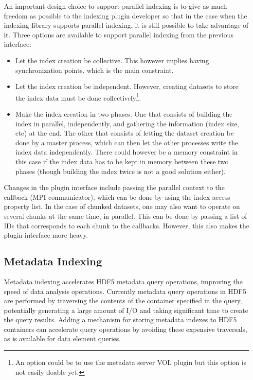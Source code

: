 An important design choice to support parallel indexing is to give as much
freedom as possible to the indexing plugin developer so that in the case when
the indexing library supports parallel indexing, it is still possible to take
advantage of it. Three options are available to support parallel indexing
from the previous interface:
\begin{itemize}
\item Let the index creation be collective. This however implies having synchronization
points, which is the main constraint.
\item Let the index creation be independent. However, creating datasets to
store the index data must be done collectively\footnote{An option could be to use
the metadata server VOL plugin but this option is not easily doable yet.}.
\item Make the index creation in two phases. One that consists of
building the index in parallel, independently, and gathering the information (index size, etc)
at the end. The other that consists of letting the dataset creation be done by a master
process, which can then let the other processes write the index data independently.
There could however be a memory constraint in this case if the index data has to
be kept in memory between these two phases (though building the index twice is not
a good solution either).
\end{itemize}

Changes in the plugin interface include passing the parallel context to the
callback (MPI communicator), which can be done by using the index access property
list.
In the case of chunked datasets, one may also want to operate on several chunks
at the same time, in parallel. This can be done by passing a list of IDs that
corresponds to each chunk to the callbacks. However, this also makes the plugin
interface more heavy.

\subsection{Metadata Indexing}

Metadata indexing accelerates HDF5 metadata query operations, improving 
the speed of data analysis operations. Currently metadata query operations
in HDF5 are performed by traversing the contents of the container specified
in the query, potentially generating a large amount of I/O and taking
significant time to create the query results. Adding a mechanism for storing
metadata indexes to HDF5 containers can accelerate query operations by avoiding
these expensive traversals, as is available for data element queries.

